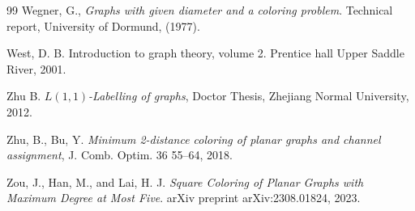 \documentclass[12pt, reqno]{amsart}
\theoremstyle{plain}
\theoremstyle{definition}
\numberwithin{equation}{section}
\begin{document}
\begin{thebibliography}{99}
Wegner, G., \textit{Graphs with given diameter and a coloring problem}. Technical report, University of Dormund,
(1977).


West, D. B. Introduction to graph theory, volume 2. Prentice hall Upper Saddle River, 2001.


Zhu B. \textit{$L(1, 1)$-Labelling of graphs}, Doctor Thesis, Zhejiang Normal University, 2012.


Zhu, B., Bu, Y.  \textit{Minimum 2-distance coloring of planar graphs and channel assignment}, J. Comb. Optim. 36  55–64, 2018.



Zou, J., Han, M., and Lai, H. J. \textit{Square Coloring of Planar Graphs with Maximum Degree at Most Five}. arXiv preprint arXiv:2308.01824, 2023.













\end{thebibliography}
\end{document}
